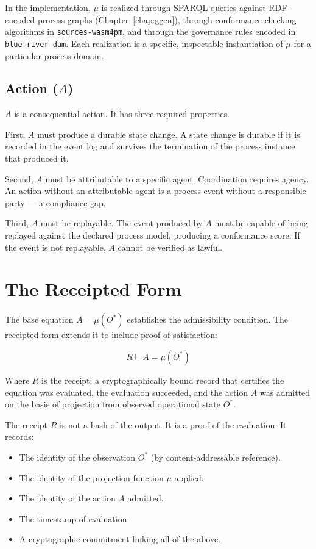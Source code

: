 In the implementation, $\mu$ is realized through SPARQL queries against RDF-encoded process graphs (Chapter~\ref{chap:ggen}), through conformance-checking algorithms in \texttt{sources-wasm4pm}, and through the governance rules encoded in \texttt{blue-river-dam}. Each realization is a specific, inspectable instantiation of $\mu$ for a particular process domain.

\subsection{Action ($A$)}

$A$ is a consequential action. It has three required properties.

First, $A$ must produce a durable state change. A state change is durable if it is recorded in the event log and survives the termination of the process instance that produced it.

Second, $A$ must be attributable to a specific agent. Coordination requires agency. An action without an attributable agent is a process event without a responsible party --- a compliance gap.

Third, $A$ must be replayable. The event produced by $A$ must be capable of being replayed against the declared process model, producing a conformance score. If the event is not replayable, $A$ cannot be verified as lawful.

\section{The Receipted Form}

The base equation $A = \mu(O^{*})$ establishes the admissibility condition. The receipted form extends it to include proof of satisfaction:

\[
R \vdash A = \mu(O^{*})
\]

Where $R$ is the receipt: a cryptographically bound record that certifies the equation was evaluated, the evaluation succeeded, and the action $A$ was admitted on the basis of projection from observed operational state $O^{*}$.

The receipt $R$ is not a hash of the output. It is a proof of the evaluation. It records:
\begin{itemize}
  \item The identity of the observation $O^{*}$ (by content-addressable reference).
  \item The identity of the projection function $\mu$ applied.
  \item The identity of the action $A$ admitted.
  \item The timestamp of evaluation.
  \item A cryptographic commitment linking all of the above.
\end{itemize}

